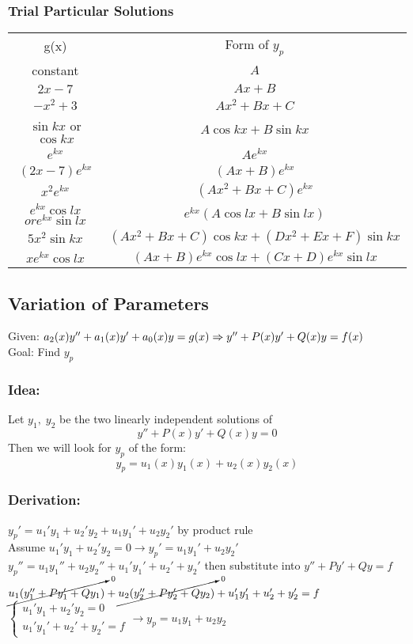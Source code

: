 \documentclass{article}
\begin{document}
\subsubsection{Trial Particular Solutions} 
\begin{tabular}{|c|c|}
    g(x) & Form of $y_p$
    \\constant & $A$
    \\ $2x-7$ & $Ax+B$
    \\$-x^2+3$& $Ax^2+Bx+C$
    \\ $\sin kx$ or $\cos kx$ & $A \cos kx + B \sin kx$
    \\ $e^{kx}$ & $Ae^{kx}$
    \\$(2x-7)e^{kx}$ & $(Ax+B)e^{kx}$
    \\$x^2e^{kx}$ & $(Ax^2+Bx+C)e^{kx}$
    \\$ e^{kx} \cos lx$ $or e^{kx} \sin lx$ & $e^{kx}(A\cos lx + B \sin lx)$
    \\ $5x^2 \sin kx$ & $(Ax^2+Bx+C)\cos kx + (Dx^2+Ex+F)\sin kx$
    \\ $xe^{kx} \cos lx$ & $(Ax+B)e^{kx}\cos lx + (Cx+D)e^{kx}\sin lx$
\end{tabular}
\subsection{Variation of Parameters}
Given: $a_2(x)y''+a_1(x)y'+a_0(x)y=g(x)\\\Rightarrow y''+P(x)y'+Q(x)y=f(x)$
\\Goal: Find $y_p$
\subsubsection{Idea:} Let $y_1,\;y_2$ be the two linearly independent solutions of $$y''+P(x)y'+Q(x)y=0$$ Then we will look for $y_p$ of the form: $$y_p=u_1(x)y_1(x)+u_2(x)y_2(x)$$
\subsubsection{Derivation:} $y_p'=u_1'y_1+u_2'y_2+u_1y_1'+u_2y_2'$ by product rule \\[0.1in] Assume $u_1'y_1+u_2'y_2=0 \rightarrow y_p'=u_1y_1'+u_2y_2'$
\\[0.1in]$y_p''=u_1y_1''+u_2y_2''+u_1'y_1'+u_2'+y_2'$ then substitute into  $y''+Py'+Qy=f$
\\[0.1in] $\cancelto{0}{u_1(y_1''+Py_1'+Qy_1)}+\cancelto{0}{u_2(y_2''+Py_2'+Qy_2)}+u_1'y_1'+u_2'+y_2'=f$
\\[0.1in]$\begin{cases}
    u_1'y_1+u_2'y_2=0
    \\u_1'y_1'+u_2'+y_2'=f
\end{cases} \rightarrow y_p=u_1y_1+u_2y_2$ 
\end{document}
